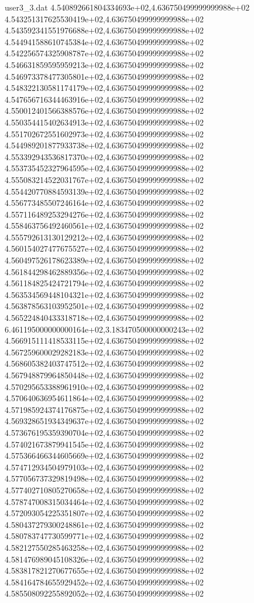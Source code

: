 \begin{filecontents}{user3_3.dat}
4.540892661804334693e+02,4.636750499999999988e+02
4.543251317625530419e+02,4.636750499999999988e+02
4.543592341551976688e+02,4.636750499999999988e+02
4.544941588610745384e+02,4.636750499999999988e+02
4.542256574325908787e+02,4.636750499999999988e+02
4.546631859595959213e+02,4.636750499999999988e+02
4.546973378477305801e+02,4.636750499999999988e+02
4.548322130581174179e+02,4.636750499999999988e+02
4.547656716344463916e+02,4.636750499999999988e+02
4.550012401566388576e+02,4.636750499999999988e+02
4.550354415402634913e+02,4.636750499999999988e+02
4.551702672551602973e+02,4.636750499999999988e+02
4.544989201877933738e+02,4.636750499999999988e+02
4.553392943536817370e+02,4.636750499999999988e+02
4.553735452327964595e+02,4.636750499999999988e+02
4.555083214522031767e+02,4.636750499999999988e+02
4.554420770884593139e+02,4.636750499999999988e+02
4.556773485507246164e+02,4.636750499999999988e+02
4.557116489253294276e+02,4.636750499999999988e+02
4.558463756492460561e+02,4.636750499999999988e+02
4.555792613130129212e+02,4.636750499999999988e+02
4.560154027477675527e+02,4.636750499999999988e+02
4.560497526178623389e+02,4.636750499999999988e+02
4.561844298462889356e+02,4.636750499999999988e+02
4.561184825424721794e+02,4.636750499999999988e+02
4.563534569448104321e+02,4.636750499999999988e+02
4.563878563103952501e+02,4.636750499999999988e+02
4.565224840433318718e+02,4.636750499999999988e+02
6.461195000000000164e+02,3.183470500000000243e+02
4.566915111418533115e+02,4.636750499999999988e+02
4.567259600029282183e+02,4.636750499999999988e+02
4.568605382403747512e+02,4.636750499999999988e+02
4.567948879964850448e+02,4.636750499999999988e+02
4.570295653388961910e+02,4.636750499999999988e+02
4.570640636954611864e+02,4.636750499999999988e+02
4.571985924374176875e+02,4.636750499999999988e+02
4.569328651934349637e+02,4.636750499999999988e+02
4.573676195359390704e+02,4.636750499999999988e+02
4.574021673879941545e+02,4.636750499999999988e+02
4.575366466344605669e+02,4.636750499999999988e+02
4.574712934504979103e+02,4.636750499999999988e+02
4.577056737329819498e+02,4.636750499999999988e+02
4.577402710805270658e+02,4.636750499999999988e+02
4.578747008315034464e+02,4.636750499999999988e+02
4.572093054225351807e+02,4.636750499999999988e+02
4.580437279300248861e+02,4.636750499999999988e+02
4.580783747730599771e+02,4.636750499999999988e+02
4.582127550285463258e+02,4.636750499999999988e+02
4.581476989045108326e+02,4.636750499999999988e+02
4.583817821270677655e+02,4.636750499999999988e+02
4.584164784655929452e+02,4.636750499999999988e+02
4.585508092255892052e+02,4.636750499999999988e+02

\end{filecontents}
